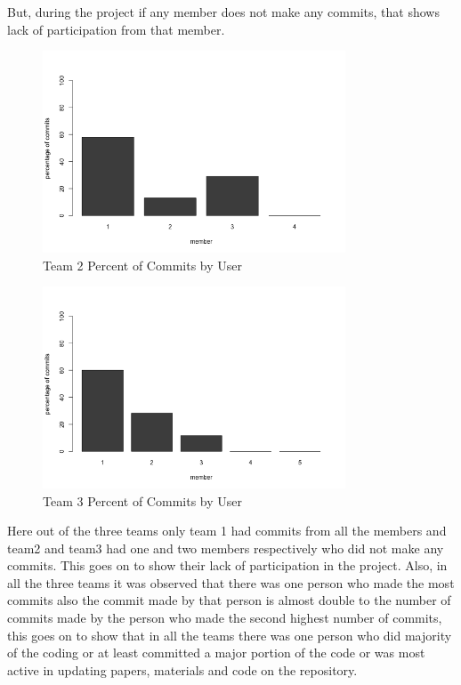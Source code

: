 \documentclass[conference]{IEEEtran}
\begin{document}
But, during the project if any member does not make any commits, that shows lack of participation from that member.

\begin{figure}[H]
    \centering
    \includegraphics[width=9cm]{../AprilProject/pic/users_commit_percentage_team2.png}
    \caption{Team 2 Percent of Commits by User}
    \label{team2_percent_commit}
\end{figure}

\begin{figure}[H]
    \centering
    \includegraphics[width=9cm]{../AprilProject/pic/users_commit_percentage_team3.png}
    \caption{Team 3 Percent of Commits by User}
    \label{team3_percent_commit}
\end{figure}

Here out of the three teams only team 1 had commits from all the members and team2 and team3 had one and two members respectively who did not make any commits. This goes on to show their lack of participation in the project. Also, in all the three teams it was observed that there was one person who made the most commits also the commit made by that person is almost double to the number of commits made by the person who made the second highest number of commits, this goes on to show that in all the teams there was one person who did majority of the coding or at least committed a major portion of the code or was most active in updating papers, materials and code on the repository.
\end{document}
